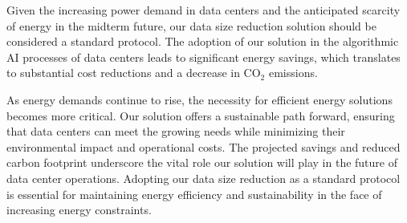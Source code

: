 Given the increasing power demand in data centers and the anticipated scarcity of energy in the midterm future, our data size reduction solution should be considered a standard protocol. The adoption of our solution in the algorithmic AI processes of data centers leads to significant energy savings, which translates to substantial cost reductions and a decrease in CO$_2$ emissions. 

As energy demands continue to rise, the necessity for efficient energy solutions becomes more critical. Our solution offers a sustainable path forward, ensuring that data centers can meet the growing needs while minimizing their environmental impact and operational costs. The projected savings and reduced carbon footprint underscore the vital role our solution will play in the future of data center operations. Adopting our data size reduction as a standard protocol is essential for maintaining energy efficiency and sustainability in the face of increasing energy constraints.
